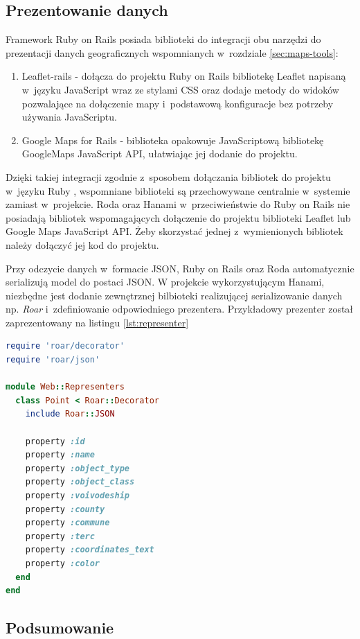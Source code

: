 \documentclass[printmode]{mgr}
\begin{document}
\subsection{Prezentowanie danych}

Framework Ruby on Rails posiada biblioteki do integracji obu narzędzi do prezentacji danych geograficznych wspomnianych w~rozdziale \ref{sec:maps-tools}:
\begin{enumerate}
  \item{Leaflet-rails} - dołącza do projektu Ruby on Rails bibliotekę Leaflet napisaną w~języku JavaScript wraz ze stylami CSS oraz dodaje metody do widoków pozwalające na dołączenie mapy i~podstawową konfiguracje bez potrzeby używania JavaScriptu.
  \item{Google Maps for Rails} - biblioteka opakowuje JavaScriptową bibliotekę GoogleMaps JavaScript API, ułatwiając jej dodanie do projektu.
\end{enumerate}
Dzięki takiej integracji zgodnie z~sposobem dołączania bibliotek do projektu w~języku Ruby \cite{doc_ruby}, wspomniane biblioteki są przechowywane centralnie w~systemie zamiast w~projekcie.
Roda oraz Hanami w~przeciwieństwie do Ruby on Rails nie posiadają bibliotek wspomagających dołączenie do projektu biblioteki Leaflet lub Google Maps JavaScript API. Żeby skorzystać jednej z~wymienionych bibliotek należy dołączyć jej kod do projektu.

Przy odczycie danych w~formacie JSON, Ruby on Rails oraz Roda automatycznie serializują model do postaci JSON. W projekcie wykorzystującym Hanami, niezbędne jest dodanie zewnętrznej bilbioteki realizującej serializowanie danych np. \textit{Roar} i~zdefiniowanie odpowiedniego prezentera. Przykładowy prezenter został zaprezentowany na listingu \ref{lst:representer}

 \begin{lstlisting}[language=Ruby, caption={Prezenter dla modelu Point}, label=lst:representer]
require 'roar/decorator'
require 'roar/json'

module Web::Representers
  class Point < Roar::Decorator
    include Roar::JSON

    property :id
    property :name
    property :object_type
    property :object_class
    property :voivodeship
    property :county
    property :commune
    property :terc
    property :coordinates_text
    property :color
  end
end
\end{lstlisting}

\subsection{Podsumowanie}
\end{document}
